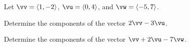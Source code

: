 \begin{activity} \label{A:9.2.5}
Let $\vv = \langle 1, -2 \rangle$, $\vu = \langle 0, 4 \rangle$, and $\vw = \langle -5, 7 \rangle$.
    \ba
    \item Determine the components of the vector $2\vv - 3\vu$.


    \item Determine the components of the vector $\vv + 2\vu - 7 \vw$.


    \ea


\end{activity}
\begin{smallhint}

\end{smallhint}
\begin{bighint}

\end{bighint}
\begin{activitySolution}

\end{activitySolution}
\aftera
